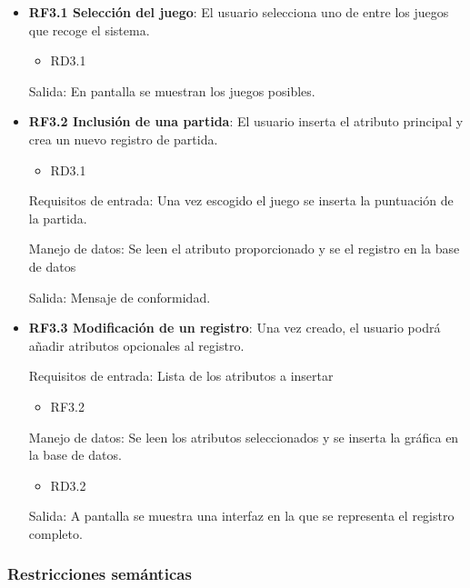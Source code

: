 \begin{itemize}
	\item \textbf{RF3.1 Selección del juego}: El usuario selecciona uno de entre los juegos que recoge el sistema.
	\begin{itemize}
		\item RD3.1
	\end{itemize}
	Salida: En pantalla se muestran los juegos posibles.
	
	\item \textbf{RF3.2 Inclusión de una partida}: El usuario inserta el atributo principal y crea un nuevo registro de partida.
	\begin{itemize}
		\item RD3.1
	\end{itemize}
	Requisitos de entrada: Una vez escogido el juego se inserta la puntuación de la partida.
	
	Manejo de datos: Se leen el atributo proporcionado y se el registro en la base de datos
	
	Salida: Mensaje de conformidad.
	
	
	\item \textbf{RF3.3 Modificación de un registro}: Una vez creado, el usuario podrá añadir atributos opcionales al registro.
	
	Requisitos de entrada: Lista de los atributos a insertar
	\begin{itemize}
		\item RF3.2
	\end{itemize}
	Manejo de datos: Se leen los atributos seleccionados y se inserta la gráfica en la base de datos.
	\begin{itemize}
		\item RD3.2
	\end{itemize}
	Salida: A pantalla se muestra una interfaz en la que se representa el registro completo.
	
\end{itemize}	
	
	\subsubsection{Restricciones semánticas}
